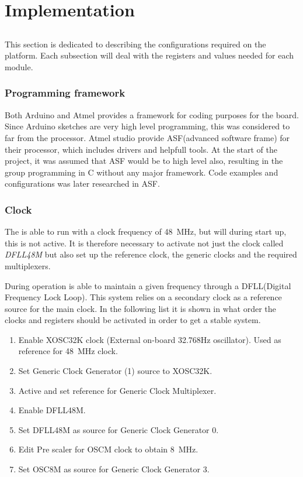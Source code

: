 
\chapter{Implementation}
\section{\SAMD}
This section is dedicated to describing the configurations required on the \SAMD platform. Each subsection will deal with the registers and values needed for each module.

\subsection{Programming framework}
Both Arduino and Atmel provides a framework for coding purposes for the \MKR board.
Since Arduino sketches are very high level programming, this was considered to far from the processor.
Atmel studio provide ASF(advanced software frame) for their processor, which includes drivers and helpfull tools.
At the start of the project, it was assumed that ASF would be to high level also, resulting in the group programming in C without any major framework.
Code examples and configurations was later researched in ASF.

\subsection{Clock}
The \SAMD is able to run with a clock frequency of \SI{48}{\mega\hertz}, but will during start up, this is not active. It is therefore necessary to activate not just the clock called \textit{DFLL48M} but also set up the reference clock, the generic clocks and the required multiplexers.

During operation \SAMD is able to maintain a given frequency through a DFLL(Digital Frequency Lock Loop).
This system relies on a secondary clock as a reference source for the main clock.
In the following list it is shown in what order the clocks and registers should be activated in order to get a stable system.

\begin{enumerate}
	\item Enable XOSC32K clock (External on-board 32.768Hz oscillator). Used as reference for \SI{48}{\mega\hertz} clock.
	\item Set Generic Clock Generator (1) source to XOSC32K.
	\item Active and set reference for Generic Clock Multiplexer.
	\item Enable DFLL48M.
	\item Set DFLL48M as source for Generic Clock Generator 0.
	\item Edit Pre scaler for OSCM clock to obtain \SI{8}{\mega\hertz}.
	\item Set OSC8M as source for Generic Clock Generator 3.
\end{enumerate} 

